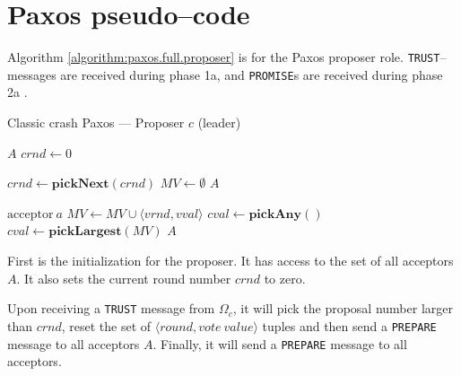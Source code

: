 \section{Paxos pseudo--code}

Algorithm \ref{algorithm:paxos.full.proposer} is for the Paxos proposer
role.  \texttt{TRUST}--messages are received during phase 1a, and
\texttt{PROMISE}s are received during phase 2a \cite{Lam01}.

\begin{algorithm}
  \caption{Classic crash Paxos --- Proposer $c$ (leader)}
  \label{algorithm:paxos.full.proposer}
  \begin{algorithmic}

    \State $A$
    \State $crnd \gets 0$
    \State

      \State $crnd \gets \textbf{pickNext}(crnd)$ 
      \State $MV \gets \emptyset$
      \State {}
                    {$A$}
    \EndOn
    \State

       {$\text{acceptor}\ a$} 
        \State $MV \gets MV \cup \langle vrnd, vval \rangle$
            \State $cval \gets \textbf{pickAny}()$
          \Else
            \State $cval \gets \textbf{pickLargest}(MV)$
          \EndIf
         \State {}
                       {$A$}
        \EndIf
      \EndIf
    \EndOn

  \end{algorithmic}
\end{algorithm}

First is the initialization for the proposer. It has access to the set of
all acceptors $A$.  It also sets the current round number $crnd$ to
zero.

Upon receiving a \texttt{TRUST} message from $\Omega_c$, it will
pick the proposal number larger than $crnd$, reset the set of $\langle round, vote~value\rangle$ tuples and then send a \texttt{PREPARE} message to all
acceptors $A$.  Finally, it will send a \texttt{PREPARE} message to all
acceptors.

